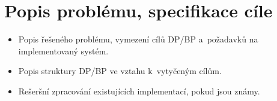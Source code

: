 \chapter{Popis problému, specifikace cíle}

\begin{itemize}
\item Popis řešeného problému, vymezení cílů DP/BP a~požadavků na implementovaný systém.
\item Popis struktury DP/BP ve vztahu k~vytyčeným cílům.
\item Rešeršní zpracování existujících implementací, pokud jsou známy.
\end{itemize}

